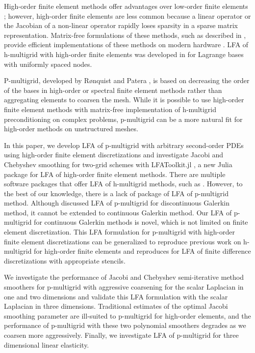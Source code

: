 \documentclass[review]{siamart190516}
\begin{document}
High-order finite element methods offer advantages over low-order finite elements \cite{demkowicz1989toward, oden1989toward, rachowicz1989toward}; however, high-order finite elements are less common because a linear operator or the Jacobian of a non-linear operator rapidly loses sparsity in a sparse matrix representation.
Matrix-free formulations of these methods, such as described in \cite{brown2010efficient, knoll2004jacobian}, provide efficient implementations of these methods on modern hardware \cite{libceed-user-manual, fischer2020scalability}.
LFA of h-multigrid with high-order finite elements was developed in \cite{he2020two} for Lagrange bases with uniformly spaced nodes.

P-multigrid, developed by R{\o}nquist and Patera \cite{ronquist1987spectral}, is based on decreasing the order of the bases in high-order or spectral finite element methods rather than aggregating elements to coarsen the mesh. While it is possible \cite{davydov2019matrix} to use high-order finite element methods with matrix-free implementation of h-multigrid preconditioning on complex problems, p-multigrid can be a more natural fit for high-order methods on unstructured meshes.

In this paper, we develop LFA of p-multigrid with arbitrary second-order PDEs using high-order finite element discretizations and investigate Jacobi and Chebyshev smoothing for two-grid schemes with LFAToolkit.jl \cite{thompson2021toolkit}, a new Julia package for LFA of high-order finite element methods.
There are multiple software packages that offer LFA of h-multigrid methods, such as \cite{kahl2020automated}. However, to the best of our knowledge,  there is a lack of package of LFA of p-multigrid method.  Although \cite{van2011discrete} discussed LFA of p-multigrid for discontinuous Galerkin method, it cannot be extended to continuous Galerkin method. Our LFA of p-multigrid for continuous Galerkin methods is novel, which is not limited on finite element discretization. This LFA formulation for p-multigrid with high-order finite element discretizations can be generalized to reproduce previous work on h-multigrid for high-order finite elements \cite{he2020two} and reproduces for LFA of finite difference discretizations with appropriate stencils.

We investigate the performance of Jacobi and Chebyshev semi-iterative method smoothers for p-multigrid with aggressive coarsening for the scalar Laplacian in one and two dimensions and validate this LFA formulation with the scalar Laplacian in three dimensions.
Traditional estimates of the optimal Jacobi smoothing parameter are ill-suited to p-multigrid for high-order elements, and the performance of p-multigrid with these two polynomial smoothers degrades as we coarsen more aggressively.
Finally, we investigate LFA of p-multigrid for three dimensional linear elasticity.
\end{document}
